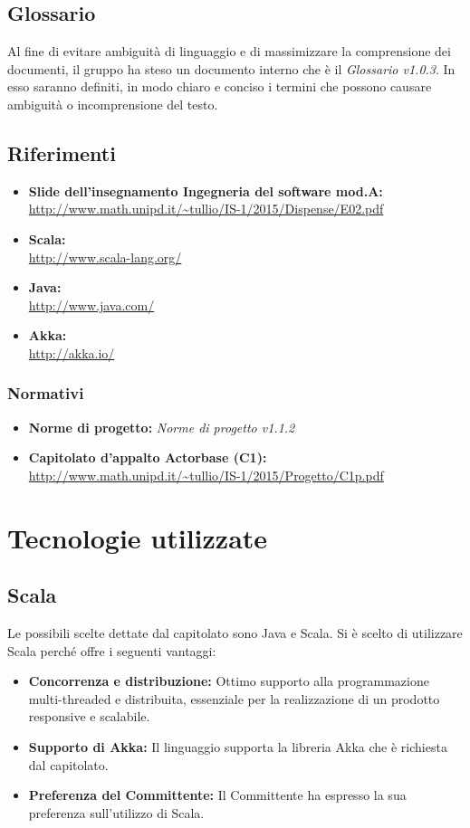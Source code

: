 \documentclass[a4paper]{article}
\begin{document}
	\subsection{Glossario}
		Al fine di evitare ambiguità di linguaggio e di massimizzare la comprensione dei documenti, il 
      gruppo ha steso un documento interno che è il \emph{Glossario v1.0.3}. In esso saranno definiti, in modo
      chiaro e conciso i termini che possono causare ambiguità o incomprensione del testo.
	\subsection{Riferimenti}
		\begin{itemize}
			\item \textbf{Slide dell'insegnamento Ingegneria del software mod.A:} \\
			\url{http://www.math.unipd.it/~tullio/IS-1/2015/Dispense/E02.pdf}
			\item \textbf{Scala:} \\
			\url{http://www.scala-lang.org/}
			\item \textbf{Java:} \\
			\url{http://www.java.com/}
			\item \textbf{Akka:} \\
			\url{http://akka.io/}
		\end{itemize}
	\subsubsection{Normativi}
		\begin{itemize}
			\item \textbf{Norme di progetto:} \emph{Norme di progetto v1.1.2}
			\item \textbf{Capitolato d'appalto Actorbase (C1):} \\ 
			\url{http://www.math.unipd.it/~tullio/IS-1/2015/Progetto/C1p.pdf}
		\end{itemize}
		
		
	\newpage 
	\section{Tecnologie utilizzate}
	\subsection{Scala}
		Le possibili scelte dettate dal capitolato sono Java e Scala. Si è scelto di utilizzare Scala perché offre i seguenti vantaggi:
		\begin{itemize}
			\item \textbf{Concorrenza e distribuzione:} Ottimo supporto alla programmazione multi-threaded e distribuita, essenziale per la realizzazione di un prodotto responsive e scalabile.
			\item \textbf{Supporto di Akka:} Il linguaggio supporta la libreria Akka che è richiesta dal capitolato.
			\item \textbf{Preferenza del Committente:} Il Committente ha espresso la sua preferenza sull'utilizzo di Scala.
		\end{itemize}
		
\end{document}
